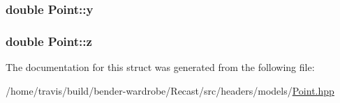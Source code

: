 \hypertarget{struct_point_afa38be143ae800e6ad69ce8ed4df62d8}{
\subsubsection[{y}]{\setlength{\rightskip}{0pt plus 5cm}double Point\-::y}}\label{struct_point_afa38be143ae800e6ad69ce8ed4df62d8}
\hypertarget{struct_point_a05ba3b1dfcb19430582ae953cbbfbded}{
\subsubsection[{z}]{\setlength{\rightskip}{0pt plus 5cm}double Point\-::z}}\label{struct_point_a05ba3b1dfcb19430582ae953cbbfbded}


The documentation for this struct was generated from the following file\-:\begin{DoxyCompactItemize}
\item 
/home/travis/build/bender-\/wardrobe/\-Recast/src/headers/models/\hyperlink{src_2headers_2models_2_point_8hpp}{Point.\-hpp}\end{DoxyCompactItemize}
